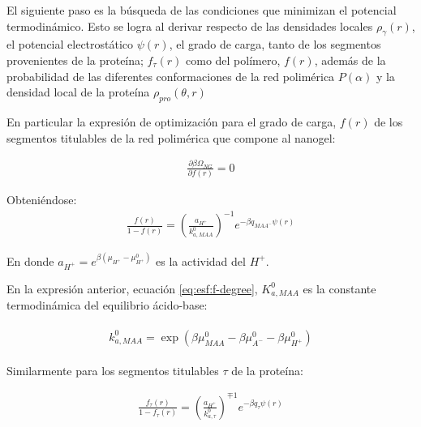 El siguiente paso es la b\'usqueda de las condiciones que minimizan el potencial termodin\'amico. Esto se logra al derivar respecto de las densidades locales $\rho_\gamma(r)$, el potencial electrost\'atico $\psi(r)$, el grado de carga, tanto de los segmentos provenientes de la prote\'ina; $f_\tau (r)$ como del pol\'imero, $f(r)$, adem\'as de la probabilidad de las diferentes conformaciones de la red polim\'erica $P(\alpha)$ y la densidad local de la prote\'ina $\rho_{pro}(\theta,r)$



En particular la expresi\'on de optimizaci\'on para el grado de carga, $f(r)$ de los segmentos titulables de la red polim\'erica que compone al nanogel:

\begin{align}
	\frac{\partial \beta \Omega_{NG}}{\partial f(r)} = 0
\end{align}

Obteni\'endose:
\begin{align}
	\frac{f(r)}{1-f(r)}= \left(\frac{a_{H^+}}{k^0_{a,MAA}}\right)^{-1} e^{-\beta q_{MAA^-}\psi(r)}
	\label{eq:esf:f-degree}
\end{align}

\noindent En donde  $a_{H^+}=e^{\beta(\mu_{H^+} -\mu^0_{H^+})}$ es la actividad del $H^+$. 

En la expresi\'on anterior, ecuaci\'on \ref{eq:esf:f-degree}, $K^0_{a,MAA}$ es la constante termodin\'amica del equilibrio \'acido-base:

\begin{align}
	\begin{aligned}
	k_{a,MAA}^0=\exp\left(\beta\mu_{MAA}^0 - \beta \mu_{A^-}^0 - \beta \mu^0_{H^+} \right)
	\end{aligned}
	\label{eq:esf:dis-rxn}
\end{align}

Similarmente para los segmentos titulables $\tau$ de la prote\'ina:

\begin{align}
	\frac{f_\tau(r)}{1-f_\tau(r)}= \left(\frac{a_{H^+}}{k^0_{a,\tau}}\right)^{\mp 1} e^{-\beta q_\tau\psi(r)}
	\label{eq:esf:ftau-degree}
\end{align}

